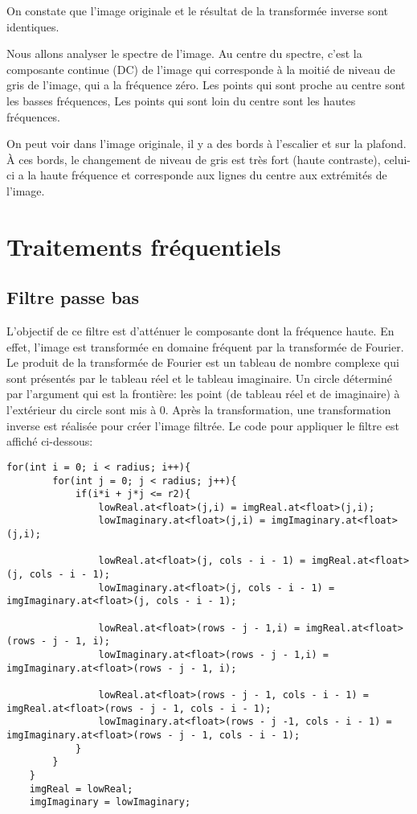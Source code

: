 \documentclass[paper=a4, fontsize=11pt]{scrartcl}	%
\begin{document}
On constate que l'image originale et le résultat de la transformée inverse sont identiques.

Nous allons analyser le spectre de l'image. Au centre du spectre, c'est la composante continue (DC) de l'image qui corresponde à la moitié de niveau de gris de l'image, qui a la fréquence zéro. Les points qui sont proche au centre sont les basses fréquences, Les points qui sont loin du centre sont les hautes fréquences. 

On peut voir dans l'image originale, il y a des bords à l'escalier et sur la plafond. À ces bords, le changement de niveau de gris est très fort (haute contraste), celui-ci a la haute fréquence et corresponde aux lignes du centre aux extrémités de l'image.
 
\section{Traitements fréquentiels}
\subsection{Filtre passe bas}
L'objectif de ce filtre est d'atténuer le composante dont la fréquence haute. En effet, l'image est transformée en domaine fréquent par la transformée de Fourier. Le produit de la transformée de Fourier est un tableau de nombre complexe qui sont présentés par le tableau réel et le tableau imaginaire. Un circle déterminé par l'argument qui est la frontière: les point (de tableau réel et de imaginaire) à l'extérieur du circle sont mis à 0. Après la transformation, une transformation inverse est réalisée pour créer l'image filtrée. Le code pour appliquer le filtre est affiché ci-dessous:

\begin{lstlisting}[label=lowpass,caption=Le filtre passe bas]
    for(int i = 0; i < radius; i++){
        for(int j = 0; j < radius; j++){
            if(i*i + j*j <= r2){
                lowReal.at<float>(j,i) = imgReal.at<float>(j,i);
                lowImaginary.at<float>(j,i) = imgImaginary.at<float>(j,i);
                                                                                                                                       
                lowReal.at<float>(j, cols - i - 1) = imgReal.at<float>(j, cols - i - 1);
                lowImaginary.at<float>(j, cols - i - 1) = imgImaginary.at<float>(j, cols - i - 1);

                lowReal.at<float>(rows - j - 1,i) = imgReal.at<float>(rows - j - 1, i);
                lowImaginary.at<float>(rows - j - 1,i) = imgImaginary.at<float>(rows - j - 1, i);

                lowReal.at<float>(rows - j - 1, cols - i - 1) = imgReal.at<float>(rows - j - 1, cols - i - 1);
                lowImaginary.at<float>(rows - j -1, cols - i - 1) = imgImaginary.at<float>(rows - j - 1, cols - i - 1);
            }
        }
    }
	imgReal = lowReal;
	imgImaginary = lowImaginary;
\end{lstlisting}
\end{document}
